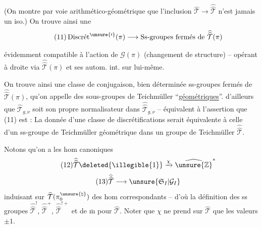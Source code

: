 

(On montre par voie arithmético-géométrique que l'inclusion
$\widehat{\mathcal{T}}\longrightarrow\widehat{\widehat{\mathcal{T}}}$
n'est jamais un iso.) On trouve ainsi une 
\[
\tag{11}
\operatorname{Discr\acute{e}t}^{\unsure{\prime}}(\pi)\longrightarrow
\text{Ss-groupes fermés de }\widehat{\widehat{\mathcal{T}}}(\pi)
\]
évidemment compatible à l'action de
$\widehat{\widehat{\mathcal{G}}}(\pi)$ (changement de structure) -- opérant
à droite via $\widehat{\widehat{\mathcal{T}}}(\pi)$ et ses autom. int. sur lui-même.

On trouve ainsi une classe de conjugaison, bien déterminée 
ss-groupes fermés de $\widehat{\widehat{\mathcal{T}}}(\pi)$,
qu'on appelle des sous-groupes de Teichmüller ``\uline{géométriques}''.
 d'ailleurs que $\widehat{\mathcal{T}}_{g,\nu}$ soit
son propre normalisateur dans $\widehat{\widehat{\mathcal{T}}}_{g,\nu}$
-- équivalent à l'assertion que (11) est  :
La donnée d'une classe de discrétifications
serait équivalente à celle d'un ss-groupe de Teichmüller géométrique dans
un groupe de Teichmüller  $\widehat{\widehat{\mathcal{T}}}$.




Notons qu'on a les hom canoniques
\[
\tag{12}
\widehat{\widehat{\mathcal{T}}}\deleted{\illegible{1}}
\xrightarrow{\chi}\widehat{\unsure{\mathbb{Z}}}^{*}
\]
\[
\tag{13}
\widehat{\widehat{\mathcal{T}}}\longrightarrow
\unsure{\mathfrak{S}_{I}|\mathcal{G}_{I}}
\]
induisant sur $\widehat{\mathcal{T}}(\pi_0^{\unsure{\natural}})$ des
 hom correspondants -- d'où la définition des
ss groupes $\widehat{\widehat{\mathcal{T}}}^{!}$,
$\widehat{\widehat{\mathcal{T}}}^{+}$,
$\widehat{\widehat{\mathcal{T}}}^{!+}$ et de $\overline{\mathrm m}$ pour
$\widehat{\mathcal{T}}$. Noter que $\chi$ ne prend sur $\widehat{\mathcal{T}}$
que les valeurs $\pm1$.

